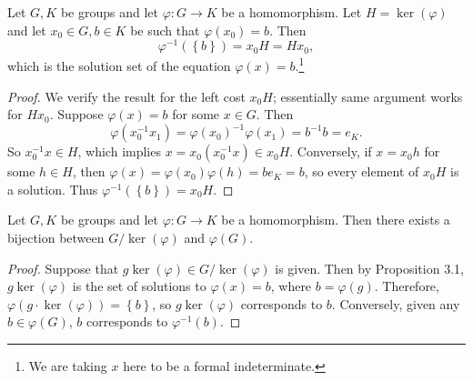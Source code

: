 \documentclass[pmath347]{subfiles}
\begin{document}
    \begin{prop}{}
        Let $G,K$ be groups and let $\varphi:G\to K$ be a homomorphism. Let $H=\ker\left( \varphi \right)$ and let $x_0\in G, b\in K$ be such that $\varphi\left( x_0 \right) = b$. Then
        \begin{equation*}
            \varphi^{-1} \left( \left\lbrace b \right\rbrace  \right) = x_0H = Hx_0,
        \end{equation*}
        which is the solution set of the equation $\varphi\left( x \right) = b$.\footnote{We are taking $x$ here to be a formal indeterminate.}
    \end{prop}

    \begin{proof}
        We verify the result for the left cost $x_0H$; essentially same argument works for $Hx_0$. Suppose $\varphi\left( x \right) = b$ for some $x\in G$. Then 
        \begin{equation*}
            \varphi\left( x_0^{-1} x_1 \right) = \varphi\left( x_0 \right)^{-1}  \varphi\left( x_1 \right) = b^{-1} b = e_K.
        \end{equation*}
        So $x_0^{-1} x\in H$, which implies $x= x_0\left( x_0^{-1} x \right) \in x_0H$. Conversely, if $x=x_0h$ for some $h\in H$, then $\varphi\left( x \right) = \varphi\left( x_0 \right) \varphi\left( h \right) = be_K = b$, so every element of $x_0H$ is a solution. Thus $\varphi^{-1} \left( \left\lbrace b \right\rbrace  \right) = x_0H$.
    \end{proof}

    \clearpage
    \begin{prop}{}
        Let $G,K$ be groups and let $\varphi:G\to K$ be a homomorphism. Then there exists a bijection between $G /\ker\left( \varphi \right)$ and $\varphi\left( G \right)$.
    \end{prop}

    \begin{proof}
        Suppose that $g\ker\left( \varphi \right) \in G /\ker\left( \varphi \right)$ is given. Then by Proposition 3.1, $g\ker\left( \varphi \right)$ is the set of solutions to $\varphi\left( x \right) = b$, where $b = \varphi\left( g \right)$. Therefore, $\varphi\left( g\cdot\ker\left( \varphi \right)  \right) = \left\lbrace b \right\rbrace$, so $g\ker\left( \varphi \right)$ corresponds to $b$. Conversely, given any $b\in \varphi\left( G \right)$, $b$ corresponds to $\varphi^{-1} \left( b \right)$. 
    \end{proof}
    
\end{document}
